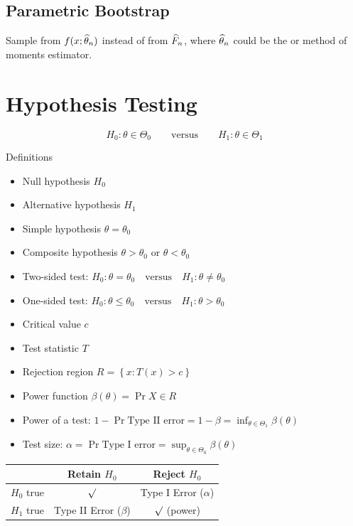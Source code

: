 \documentclass[landscape]{article}
\begin{document}
\begin{multicols*}{2}
\subsection{Parametric Bootstrap}

Sample from $f(x;\widehat{\theta}_n)$ instead of from $\widehat{F}_n$, where $\widehat{\theta}_n$ could be
the \mle or method of moments estimator.

\section{Hypothesis Testing}

\[H_0:\theta\in\Theta_0 \qquad\text{versus}\qquad H_1:\theta\in\Theta_1\]

Definitions
\begin{itemize}
  \item Null hypothesis $H_0$
  \item Alternative hypothesis $H_1$
  \item Simple hypothesis $\theta = \theta_0$
  \item Composite hypothesis $\theta > \theta_0$ or $\theta < \theta_0$
  \item Two-sided test:
    $H_0:\theta=\theta_0 \quad\text{versus}\quad H_1:\theta\neq\theta_0$
  \item One-sided test:
    $H_0:\theta\le\theta_0 \quad\text{versus}\quad H_1:\theta>\theta_0$
  \item Critical value $c$
  \item Test statistic $T$
  \item Rejection region $R = \left\{ x: T(x) > c \right\}$
  \item Power function $\beta(\theta) = \Pr{X \in R}$
  \item Power of a test: $1 - \Pr{\text{Type II error}} = 1-\beta
    = \displaystyle\inf_{\theta \in \Theta_1} \beta(\theta)$
  \item Test size: $\alpha = \Pr{\text{Type I error}}
    = \displaystyle\sup_{\theta\in\Theta_0}\beta(\theta)$
\end{itemize}

\centering
\begin{tabular}{l|cc}
  & \textsf{Retain} $H_0$ & \textsf{Reject} $H_0$ \\
  \hline
  $H_0$ \textsf{true} & $\surd$ & Type I Error ($\alpha$)\\
  $H_1$ \textsf{true} & Type II Error ($\beta$) &
  $\surd$ (power) \\
\end{tabular}


\end{multicols*}
\end{document}
